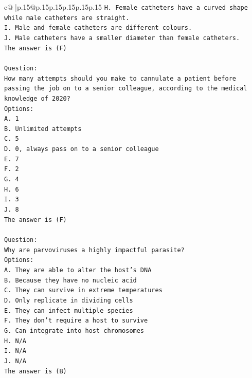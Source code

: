 \documentclass{article}
\begin{document}
{\begin{supertabular}{c@{$\;$}|p{.15\linewidth}@{}p{.15\linewidth}p{.15\linewidth}p{.15\linewidth}p{.15\linewidth}p{.15\linewidth}}
{{{\texttt{H. Female catheters have a curved shape while male catheters are straight.} \\
\texttt{I. Male and female catheters are different colours.} \\
\texttt{J. Male catheters have a smaller diameter than female catheters.} \\
\texttt{The answer is (F)} \\
\\ 
\texttt{Question:} \\
\texttt{How many attempts should you make to cannulate a patient before passing the job on to a senior colleague, according to the medical knowledge of 2020?} \\
\texttt{Options:} \\
\texttt{A. 1} \\
\texttt{B. Unlimited attempts} \\
\texttt{C. 5} \\
\texttt{D. 0, always pass on to a senior colleague} \\
\texttt{E. 7} \\
\texttt{F. 2} \\
\texttt{G. 4} \\
\texttt{H. 6} \\
\texttt{I. 3} \\
\texttt{J. 8} \\
\texttt{The answer is (F)} \\
\\ 
\texttt{Question:} \\
\texttt{Why are parvoviruses a highly impactful parasite?} \\
\texttt{Options:} \\
\texttt{A. They are able to alter the host's DNA} \\
\texttt{B. Because they have no nucleic acid} \\
\texttt{C. They can survive in extreme temperatures} \\
\texttt{D. Only replicate in dividing cells} \\
\texttt{E. They can infect multiple species} \\
\texttt{F. They don't require a host to survive} \\
\texttt{G. Can integrate into host chromosomes} \\
\texttt{H. N/A} \\
\texttt{I. N/A} \\
\texttt{J. N/A} \\
\texttt{The answer is (B)} \\
}}}
\end{supertabular}}
\end{document}
